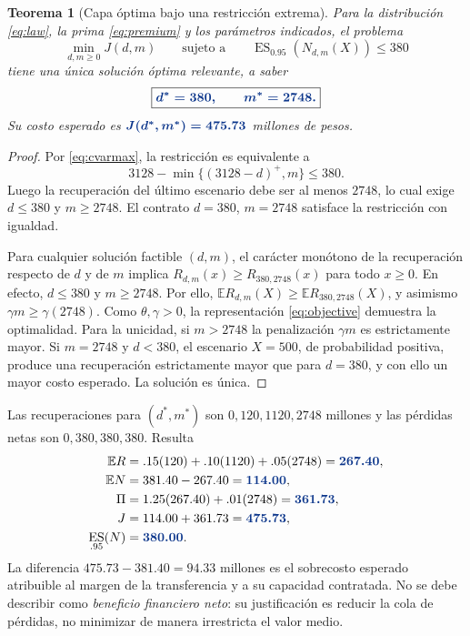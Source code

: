 \documentclass[11pt,reqno]{amsart}
\newtheorem{theorem}{Teorema}[section]
\theoremstyle{definition}\newtheorem{definition}[theorem]{Definición}
\theoremstyle{remark}\newtheorem{remark}[theorem]{Observación}
\DeclareMathOperator{\ES}{ES}
\newcommand{\E}{\mathbb E}
\newcommand{\pos}[1]{(#1)^+}
\newcommand{\resultado}[1]{{\color{resultblue}\boldsymbol{#1}}}
\begin{document}
\begin{theorem}[Capa óptima bajo una restricción extrema]\label{thm:opt}
Para la distribución \eqref{eq:law}, la prima \eqref{eq:premium} y los parámetros indicados, el problema
\[
\min_{d,m\ge0}J(d,m)\qquad\text{sujeto a}\qquad
\ES_{0.95}(N_{d,m}(X))\le380
\]
tiene una única solución óptima relevante, a saber
\begin{equation}\label{eq:answer}
\boxed{\resultado{d^*=380,\qquad m^*=2748.}}
\end{equation}
Su costo esperado es $\resultado{J(d^*,m^*)=475.73}$ millones de pesos.
\end{theorem}
\begin{proof}
Por \eqref{eq:cvarmax}, la restricción es equivalente a
\[
3128-\min\{\pos{3128-d},m\}\le380.
\]
Luego la recuperación del último escenario debe ser al menos $2748$, lo cual exige $d\le380$ y $m\ge2748$. El contrato $d=380$, $m=2748$ satisface la restricción con igualdad.

Para cualquier solución factible $(d,m)$, el carácter monótono de la recuperación respecto de $d$ y de $m$ implica
$R_{d,m}(x)\ge R_{380,2748}(x)$ para todo $x\ge0$. En efecto, $d\le380$ y $m\ge2748$. Por ello, $\E R_{d,m}(X)\ge\E R_{380,2748}(X)$, y asimismo $\gamma m\ge\gamma(2748)$. Como $\theta,\gamma>0$, la representación \eqref{eq:objective} demuestra la optimalidad. Para la unicidad, si $m>2748$ la penalización $\gamma m$ es estrictamente mayor. Si $m=2748$ y $d<380$, el escenario $X=500$, de probabilidad positiva, produce una recuperación estrictamente mayor que para $d=380$, y con ello un mayor costo esperado. La solución es única.
\end{proof}

Las recuperaciones para $(d^*,m^*)$ son $0,120,1120,2748$ millones y las pérdidas netas son $0,380,380,380$. Resulta
\begin{align*}
\E R&=.15(120)+.10(1120)+.05(2748)=\resultado{267.40},\\
\E N&=381.40-267.40=\resultado{114.00},\\
\Pi&=1.25(267.40)+.01(2748)=\resultado{361.73},\\
J&=114.00+361.73=\resultado{475.73},\\
\ES_{.95}(N)&=\resultado{380.00}.
\end{align*}
La diferencia $475.73-381.40=94.33$ millones es el sobrecosto esperado atribuible al margen de la transferencia y a su capacidad contratada. No se debe describir como \emph{beneficio financiero neto}: su justificación es reducir la cola de pérdidas, no minimizar de manera irrestricta el valor medio.
\end{document}
